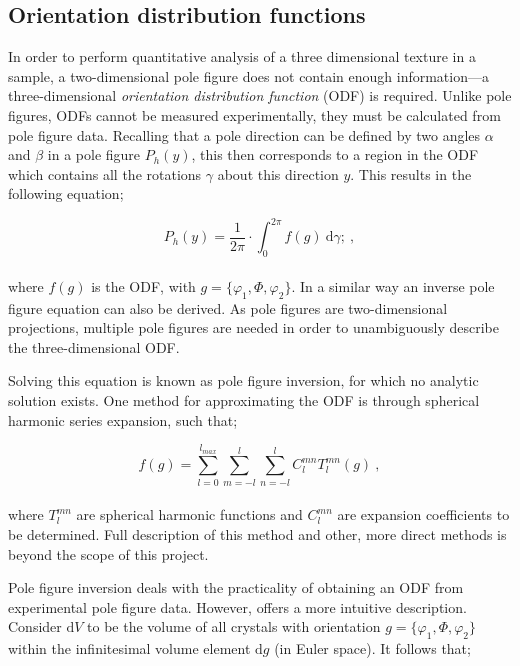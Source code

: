 \documentclass[a4paper,12pt]{report}
\numberwithin{equation}{chapter}
\begin{document}
\subsection{Orientation distribution functions} \label{subsec:ODFs}
In order to perform quantitative analysis of a three dimensional texture in a sample, a two-dimensional pole figure does not contain enough information---a three-dimensional \emph{orientation distribution function} (ODF) is required. Unlike pole figures, ODFs cannot be measured experimentally, they must be calculated from pole figure data. Recalling that a pole direction can be defined by two angles $\alpha$ and $\beta$ in a pole figure $P_h(y)$, this then corresponds to a region in the ODF which contains all the rotations $\gamma$ about this direction $y$. This results in the following equation; 




\begin{equation} \label{eq:pole_figures}
P_h(y) = \frac{1}{2\pi} \cdot \int_{0}^{2\pi}f(g)\ \mathrm{d}\gamma;\ ,
\end{equation}
\\
where $f(g)$ is the ODF, with $g = \{\varphi_1,\Phi,\varphi_2\}$. In a similar way an inverse pole figure equation can also be derived. As pole figures are two-dimensional projections, multiple pole figures are needed in order to unambiguously describe the three-dimensional ODF.



Solving this equation is known as pole figure inversion, for which no analytic solution exists. One method for approximating the ODF is through spherical harmonic series expansion, such that;




\begin{equation} \label{eq:series_exp}
f(g) = \sum_{l=0}^{l_{max}} \sum_{m=-l}^l \sum_{n=-l}^l C_l^{mn} T_l^{mn} (g) \ ,
\end{equation}
\\
where $T_l^{mn}$ are spherical harmonic functions and $C_l^{mn}$ are expansion coefficients to be determined. Full description of this method \citep[][for detailed description]{bunge1982texture} and other, more direct methods \citep{Randle2000} is beyond the scope of this project.



Pole figure inversion deals with the practicality of obtaining an ODF from experimental pole figure data. However, \cite{bunge1982texture} offers a more intuitive description. Consider $\mathrm{d}V$ to be the volume of all crystals with orientation $g = \{\varphi_1,\Phi,\varphi_2\}$ within the infinitesimal volume element $\mathrm{d}g$ (in Euler space). It follows that;
\end{document}
